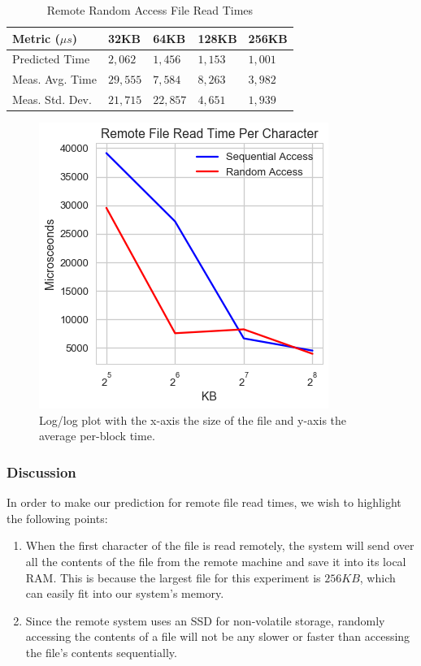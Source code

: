 \documentclass[sigconf]{acmart}
\begin{document}
\begin{table}[h!]
\caption{Remote Random Access File Read Times}
\label{RemoteRandomFileReadTimes}
\begin{tabular}{|l|l|l|l|l|}
\hline
\textbf{Metric ($\mu s$)}	& \textbf{32KB} & \textbf{64KB} & \textbf{128KB}	& \textbf{256KB}   	\\ \hline
Predicted Time				& $2,062$		& $1,456$		& $1,153$			& $1,001$			\\ \hline
Meas. Avg. Time				& $29,555$		& $7,584$		& $8,263$			& $3,982$			\\ \hline
Meas. Std. Dev.				& $21,715$		& $22,857$		& $4,651$			& $1,939$			\\ \hline
\end{tabular}
\end{table}

\begin{figure}[h]
\includegraphics[scale=0.7]{images/remote_file_read_time.png}
\caption{Log/log plot with the x-axis the size of the file and y-axis the average per-block time.}
\label{RemoteFileReadTimePlot}
\end{figure}

\subsubsection{Discussion}
In order to make our prediction for remote file read times, we wish to highlight the following points:

\begin{enumerate}
	\item When the first character of the file is read remotely, the system will send over all the contents of the file from the remote machine and save it into its local RAM. This is because the largest file for this experiment is $256KB$, which can easily fit into our system's memory.
	\item Since the remote system uses an SSD for non-volatile storage, randomly accessing the contents of a file will not be any slower or faster than accessing the file's contents sequentially.
\end{enumerate}
\end{document}
